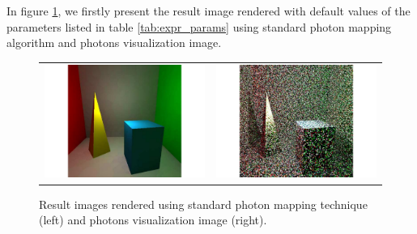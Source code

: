 In figure \ref{fig:pm_global}, we firstly present the result image rendered with default values of the parameters listed in table \ref{tab:expr_params} using standard photon mapping algorithm and photons visualization image. 

\begin{figure}[htp] 
\begin{center}
	\begin{tabular}{c | c}
		\includegraphics*[scale=0.25]{imgs/pq_ref.pdf} &
		\includegraphics*[scale=0.25]{imgs/pqv_ref.pdf}
	\end{tabular}
    \renewcommand{\thefigure}{\thechapter.\arabic{figure}}
    \caption[Rendered images and photons visualization with standard photon mapping technique]{Result images rendered using standard photon mapping technique (left) and photons visualization image (right).}
    \label{fig:pm_global} 
\end{center} 
\end{figure}   

